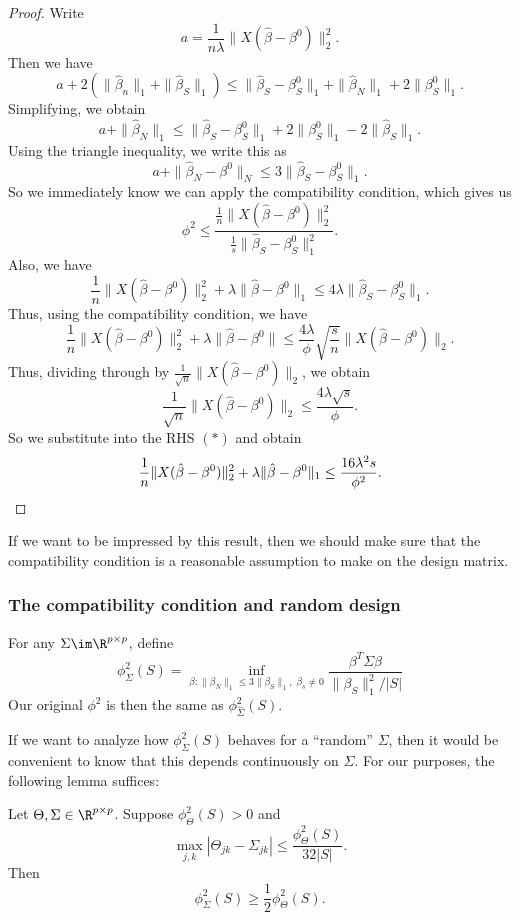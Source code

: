 \documentclass[a4paper]{article}
\begin{document}
\begin{proof}
  Write
  \[
    a = \frac{1}{n\lambda} \|X (\hat{\beta} - \beta^0)\|_2^2.
  \]
  Then we have
  \[
    a + 2 (\|\hat{\beta}_n\|_1 + \|\hat{\beta}_S\|_1) \leq \|\hat{\beta}_S - \beta^0_S \|_1 + \|\hat{\beta}_N\|_1 + 2 \|\beta^0_S\|_1.
  \]
  Simplifying, we obtain
  \[
    a + \|\hat{\beta}_N\|_1 \leq \|\hat{\beta}_S - \beta^0_S\|_1 + 2 \|\beta^0_S\|_1 - 2 \|\hat{\beta}_S\|_1.
  \]
  Using the triangle inequality, we write this as
  \[
    a + \|\hat{\beta}_N - \beta^0\|_N \leq 3 \|\hat{\beta}_S - \beta_S^0\|_1.
  \]
  So we immediately know we can apply the compatibility condition, which gives us
  \[
    \phi^2 \leq \frac{\frac{1}{n} \|X (\hat{\beta} - \beta^0)\|_2^2}{\frac{1}{s} \|\hat{\beta}_S - \beta^0_S\|_1^2}.
  \]
  Also, we have
  \[
    \frac{1}{n} \|X(\hat{\beta} -\beta^0)\|_2^2 + \lambda \|\hat{\beta} - \beta^0\|_1 \leq 4 \lambda\|\hat{\beta}_S - \beta^0_S\|_1.
  \]
  Thus, using the compatibility condition, we have
  \[
    \frac{1}{n} \|X (\hat{\beta} - \beta^0)\|^2_2 + \lambda \|\hat{\beta} - \beta^0\| \leq \frac{4 \lambda}{\phi} \sqrt{\frac{s}{n}} \|X (\hat{\beta} - \beta^0)\|_2.
  \]
  Thus, dividing through by $\frac{1}{\sqrt{n}} \|X(\hat{\beta} - \beta^0)\|_2$, we obtain
  \[
    \frac{1}{\sqrt{n}} \|X(\hat{\beta} - \beta^0)\|_2 \leq \frac{4 \lambda \sqrt{s}}{\phi}.\tag{$*$}
  \]
  So we substitute into the RHS $(*)$ and obtain
  \[
    \frac{1}{n} \|X (\hat{\beta} - \beta^0)\|_2^2 + \lambda \|\hat{\beta} - \beta^0\|_1 \leq \frac{16 \lambda^2 s}{\phi^2}.\qedhere
  \]
\end{proof}
If we want to be impressed by this result, then we should make sure that the compatibility condition is a reasonable assumption to make on the design matrix.

\subsubsection*{The compatibility condition and random design}
For any $\Sigma \im \R^{p \times p}$, define
\[
  \phi_{\Sigma}^2(S) = \inf_{\beta: \|\beta_N\|_1 \leq 3 \|\beta_S\|_1,\; \beta_s \not= 0} \frac{\beta^T \Sigma \beta}{\|\beta_S\|_1^2/|S|}
\]
Our original $\phi^2$ is then the same as $\phi^2_{\hat{\Sigma}}(S)$.

If we want to analyze how $\phi^2_{\Sigma}(S)$ behaves for a ``random'' $\Sigma$, then it would be convenient to know that this depends continuously on $\Sigma$. For our purposes, the following lemma suffices:
\begin{lemma}
  Let $\Theta, \Sigma \in \R^{p \times p}$. Suppose $\phi^2_\Theta(S) > 0$ and
  \[
    \max_{j, k} |\Theta_{jk} - \Sigma_{jk}| \leq \frac{\phi^2_{\Theta}(S)}{32|S|}.
  \]
  Then
  \[
    \phi^2_\Sigma(S) \geq \frac{1}{2} \phi^2_\Theta(S).
  \]
\end{lemma}
\end{document}
